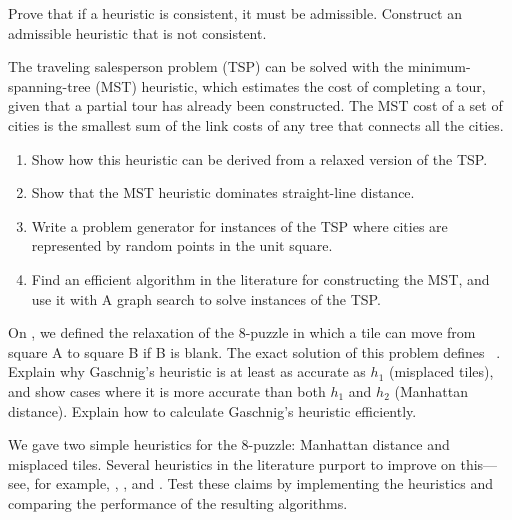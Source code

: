 \begin{exercise}%
Prove that if a heuristic is consistent, it must be admissible.
Construct an admissible heuristic that is not consistent.
\end{exercise} 

\begin{exercise}%
\prgex
The traveling salesperson problem (TSP) 
can be solved with the
minimum-spanning-tree (MST) heuristic, which estimates the
cost of completing a tour, given that a partial tour has already been
constructed. The MST cost of a set of cities is the smallest sum of the
link costs of any tree that connects all the cities.
\begin{enumerate}
\item Show how this
heuristic can be derived from a relaxed version of the TSP.
\item Show that the MST heuristic dominates straight-line distance.
\item Write a problem generator for instances of the TSP where cities are
represented by random points in the unit square. 
\item Find an
efficient algorithm in the literature for constructing the MST, and
use it with A{\star} graph search to solve instances of the TSP.
\end{enumerate}
\end{exercise} 

\begin{exercise}%
On , we defined the relaxation of the 8-puzzle
in which a tile can move from square A to square B if B is blank. The
exact solution of this problem defines ~\cite{Gaschnig:1979}. Explain why Gaschnig's heuristic is
at least as accurate as \(h_1\) (misplaced tiles), and show cases where
it is more accurate than both \(h_1\) and \(h_2\) (Manhattan
distance). Explain how to calculate Gaschnig's heuristic
efficiently.
\end{exercise} 

\begin{exercise}
\prgex
We gave two simple heuristics for the 8-puzzle: Manhattan distance and
misplaced tiles.  Several heuristics in the literature purport to improve on
this---see, for example, ,
, and .
Test these claims by implementing the heuristics and comparing the
performance of the resulting algorithms.
\end{exercise} 






\resetmedskipamount
